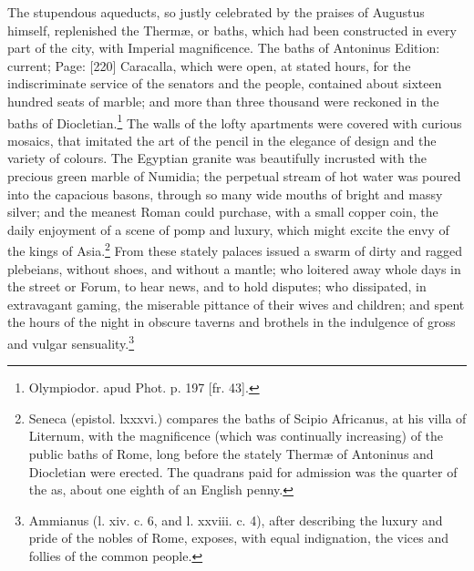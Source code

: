 The stupendous aqueducts, so justly celebrated by the praises of Augustus himself, replenished the Thermæ, or baths, which had been constructed in every part of the city, with Imperial magnificence. The baths of Antoninus Edition: current; Page: [220] Caracalla, which were open, at stated hours, for the indiscriminate service of the senators and the people, contained about sixteen hundred seats of marble; and more than three thousand were reckoned in the baths of Diocletian.\footnote{Olympiodor. apud Phot. p. 197 [fr. 43].} The walls of the lofty apartments were covered with curious mosaics, that imitated the art of the pencil in the elegance of design and the variety of colours. The Egyptian granite was beautifully incrusted with the precious green marble of Numidia; the perpetual stream of hot water was poured into the capacious basons, through so many wide mouths of bright and massy silver; and the meanest Roman could purchase, with a small copper coin, the daily enjoyment of a scene of pomp and luxury, which might excite the envy of the kings of Asia.\footnote{Seneca (epistol. lxxxvi.) compares the baths of Scipio Africanus, at his villa of Liternum, with the magnificence (which was continually increasing) of the public baths of Rome, long before the stately Thermæ of Antoninus and Diocletian were erected. The quadrans paid for admission was the quarter of the as, about one eighth of an English penny.} From these stately palaces issued a swarm of dirty and ragged plebeians, without shoes, and without a mantle; who loitered away whole days in the street or Forum, to hear news, and to hold disputes; who dissipated, in extravagant gaming, the miserable pittance of their wives and children; and spent the hours of the night in obscure taverns and brothels in the indulgence of gross and vulgar sensuality.\footnote{Ammianus (l. xiv. c. 6, and l. xxviii. c. 4), after describing the luxury and pride of the nobles of Rome, exposes, with equal indignation, the vices and follies of the common people.}

